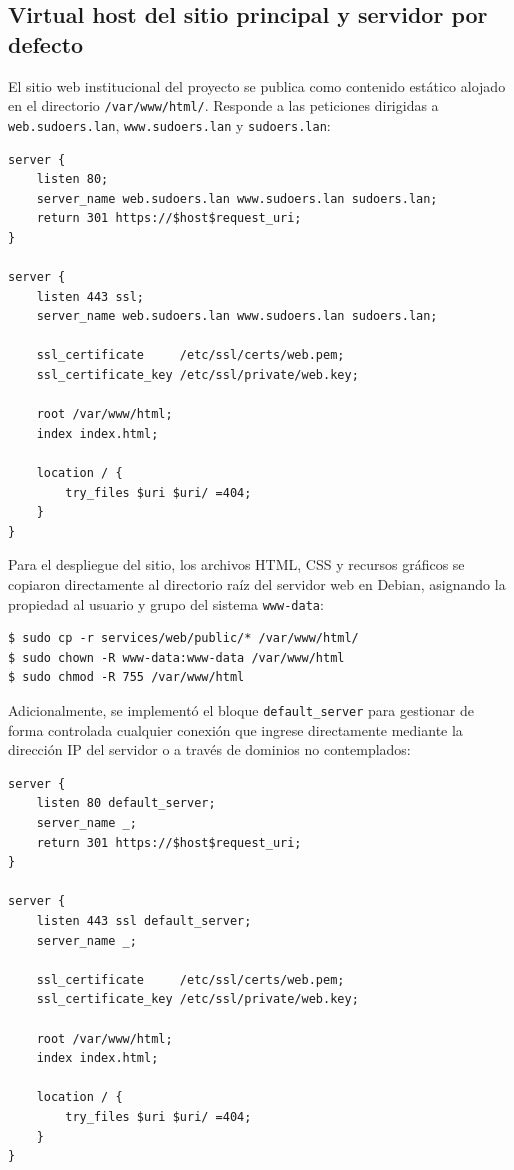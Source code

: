 \subsection{Virtual host del sitio principal y servidor por defecto}

El sitio web institucional del proyecto se publica como contenido estático
alojado en el directorio \texttt{/var/www/html/}. Responde a las peticiones
dirigidas a \texttt{web.sudoers.lan}, \texttt{www.sudoers.lan} y
\texttt{sudoers.lan}:

\begin{lstlisting}[style=terminal]
server {
    listen 80;
    server_name web.sudoers.lan www.sudoers.lan sudoers.lan;
    return 301 https://$host$request_uri;
}

server {
    listen 443 ssl;
    server_name web.sudoers.lan www.sudoers.lan sudoers.lan;

    ssl_certificate     /etc/ssl/certs/web.pem;
    ssl_certificate_key /etc/ssl/private/web.key;

    root /var/www/html;
    index index.html;

    location / {
        try_files $uri $uri/ =404;
    }
}
\end{lstlisting}

Para el despliegue del sitio, los archivos HTML, CSS y recursos gráficos se
copiaron directamente al directorio raíz del servidor web en Debian, asignando la
propiedad al usuario y grupo del sistema \texttt{www-data}:

\begin{lstlisting}[style=terminal]
$ sudo cp -r services/web/public/* /var/www/html/
$ sudo chown -R www-data:www-data /var/www/html
$ sudo chmod -R 755 /var/www/html
\end{lstlisting}

Adicionalmente, se implementó el bloque \texttt{default\_server} para gestionar
de forma controlada cualquier conexión que ingrese directamente mediante la
dirección IP del servidor o a través de dominios no contemplados:

\begin{lstlisting}[style=terminal]
server {
    listen 80 default_server;
    server_name _;
    return 301 https://$host$request_uri;
}

server {
    listen 443 ssl default_server;
    server_name _;

    ssl_certificate     /etc/ssl/certs/web.pem;
    ssl_certificate_key /etc/ssl/private/web.key;

    root /var/www/html;
    index index.html;

    location / {
        try_files $uri $uri/ =404;
    }
}
\end{lstlisting}

